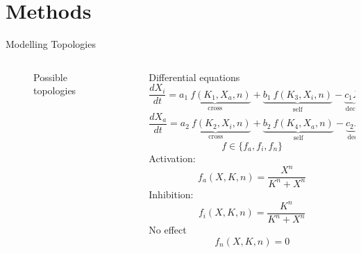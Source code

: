 \documentclass[aspectratio=169,9pt]{beamer}
\begin{document}
    \section{Methods}
    \begin{frame}{Modelling Topologies}
        \begin{columns}
            \begin{column}{0.33\textwidth}
                \begin{figure}
                    \centering
                    \caption{Possible topologies}
                \end{figure}
            \end{column}
            \pause
            \begin{column}{0.63\textwidth}
                Differential equations
                \begin{equation}
                    \frac{dX_i}{dt} = \underbrace{a_1\ f(K_1,X_a,n)}_\text{cross} + \underbrace{b_1\ f(K_3,X_i,n)}_\text{self} - \underbrace{c_1 X_i}_\text{decay}
                \end{equation}
                \begin{equation}
                    \frac{dX_a}{dt} = \underbrace{a_2\ f(K_2,X_i,n)}_\text{cross} + \underbrace{b_2\ f(K_4,X_a,n)}_\text{self} - \underbrace{c_2 X_a}_\text{decay}
                \end{equation}
                $$f \in \{ f_a, f_i, f_n\}$$
                \pause
                Activation:
                \begin{equation}
                    f_a(X,K,n) = \frac{{X}^n}{{K}^n+{X}^n}
                \end{equation}
                Inhibition:
                \begin{equation}
                    f_i(X,K,n) = \frac{{K}^n}{{K}^n+{X}^n}
                \end{equation}
                No effect
                \begin{equation}
                    f_n(X,K,n) = 0
                \end{equation}
            \end{column}
        \end{columns}
    \end{frame}
\end{document}
